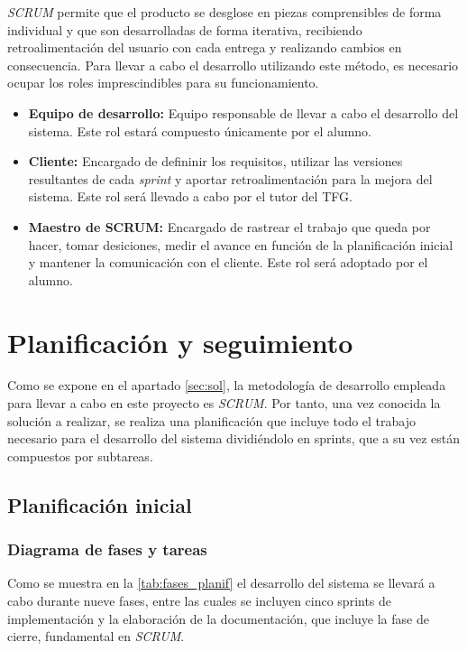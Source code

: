 \documentclass[12pt, twoside]{article}
\begin{document}
    \textit{SCRUM} permite que el producto se desglose en piezas comprensibles de forma individual y que son desarrolladas de forma iterativa, recibiendo retroalimentación del usuario con cada entrega y realizando cambios en consecuencia. Para llevar a cabo el desarrollo utilizando este método, es necesario ocupar los roles imprescindibles para su funcionamiento.

    \begin{itemize}
        \item \textbf{Equipo de desarrollo:} Equipo responsable de llevar a cabo el desarrollo del sistema. Este rol estará compuesto únicamente por el alumno.
        \item \textbf{Cliente:} Encargado de defininir los requisitos, utilizar las versiones resultantes de cada \textit{sprint} y aportar retroalimentación para la mejora del sistema. Este rol será llevado a cabo por el tutor del TFG.
        \item \textbf{Maestro de SCRUM:} Encargado de rastrear el trabajo que queda por hacer, tomar desiciones, medir el avance en función de la planificación inicial y mantener la comunicación con el cliente. Este rol será adoptado por el alumno.
    \end{itemize}

\cleardoublepage \section{Planificación y seguimiento} \label{sec:plan}
    Como se expone en el apartado \ref{sec:sol}, la metodología de desarrollo empleada para llevar a cabo en este proyecto es \textit{SCRUM}. Por tanto, una vez conocida la solución a realizar, se realiza una planificación que incluye todo el trabajo necesario para el desarrollo del sistema dividiéndolo en sprints, que a su vez están compuestos por subtareas.

    \subsection{Planificación inicial}
        \subsubsection{Diagrama de fases y tareas}
        Como se muestra en la \ref{tab:fases_planif} el desarrollo del sistema se llevará a cabo durante nueve fases, entre las cuales se incluyen cinco sprints de implementación y la elaboración de la documentación, que incluye la fase de cierre, fundamental en \textit{SCRUM}.
\end{document}
